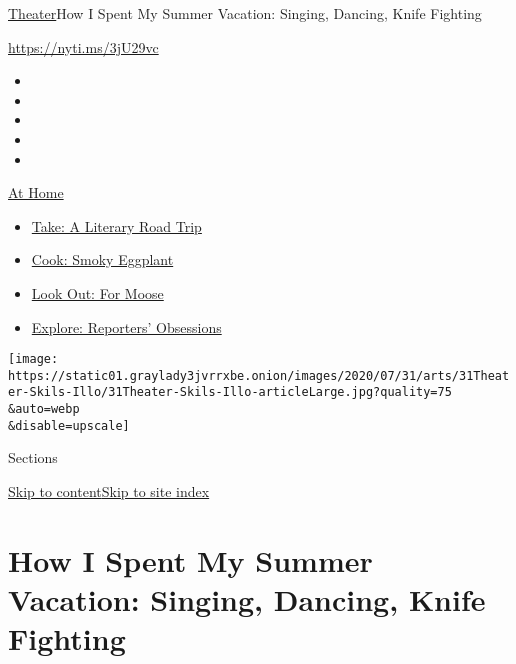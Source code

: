 \href{/section/theater}{Theater}\textbar{}How I Spent My Summer
Vacation: Singing, Dancing, Knife Fighting

\url{https://nyti.ms/3jU29vc}

\begin{itemize}
\item
\item
\item
\item
\item
\end{itemize}

\href{https://www.nytimes3xbfgragh.onion/spotlight/at-home?action=click\&pgtype=Article\&state=default\&region=TOP_BANNER\&context=at_home_menu}{At
Home}

\begin{itemize}
\tightlist
\item
  \href{https://www.nytimes3xbfgragh.onion/2020/07/28/books/time-for-a-literary-road-trip.html?action=click\&pgtype=Article\&state=default\&region=TOP_BANNER\&context=at_home_menu}{Take:
  A Literary Road Trip}
\item
  \href{https://www.nytimes3xbfgragh.onion/2020/07/29/magazine/bored-with-your-home-cooking-some-smoky-eggplant-will-fix-that.html?action=click\&pgtype=Article\&state=default\&region=TOP_BANNER\&context=at_home_menu}{Cook:
  Smoky Eggplant}
\item
  \href{https://www.nytimes3xbfgragh.onion/2020/07/27/travel/moose-michigan-isle-royale.html?action=click\&pgtype=Article\&state=default\&region=TOP_BANNER\&context=at_home_menu}{Look
  Out: For Moose}
\item
  \href{https://www.nytimes3xbfgragh.onion/interactive/2020/at-home/even-more-reporters-editors-diaries-lists-recommendations.html?action=click\&pgtype=Article\&state=default\&region=TOP_BANNER\&context=at_home_menu}{Explore:
  Reporters' Obsessions}
\end{itemize}

\texttt{[image: https://static01.graylady3jvrrxbe.onion/images/2020/07/31/arts/31Theater-Skils-Illo/31Theater-Skils-Illo-articleLarge.jpg?quality=75\\\&auto=webp\\\&disable=upscale]}

Sections

\protect\hyperlink{site-content}{Skip to
content}\protect\hyperlink{site-index}{Skip to site index}

\hypertarget{how-i-spent-my-summer-vacation-singing-dancing-knife-fighting}{%
\section{How I Spent My Summer Vacation: Singing, Dancing, Knife
Fighting}\label{how-i-spent-my-summer-vacation-singing-dancing-knife-fighting}}

